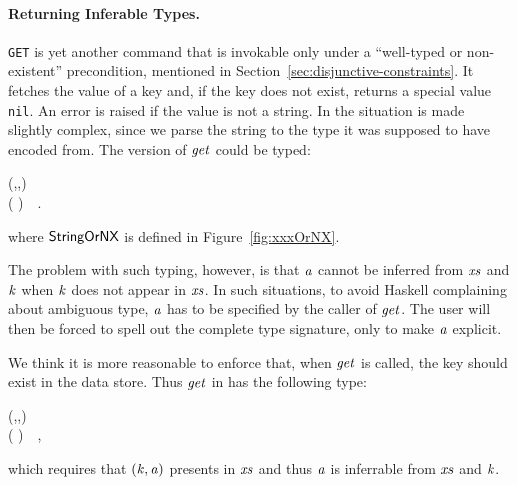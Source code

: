 \paragraph{Returning Inferable Types.} \texttt{GET} is yet another command that
is invokable only under a ``well-typed or non-existent'' precondition,
mentioned in Section~\ref{sec:disjunctive-constraints}. It fetches the value of
a key and, if the key does not exist, returns a special value \texttt{nil}. An
error is raised if the value is not a string. In \Edis{} the situation is made
slightly complex, since we parse the string to the type it was supposed to have
encoded from. The \Edis{} version of \ensuremath{\Varid{get}} could be typed:
\begin{hscode}\SaveRestoreHook
{}%
%
%
\>[B]{}\<[6]%
\>[6]{}\mathbin{::}(\;,\;,\;\;){}\<[E]%
\\
\>[6]{}\Rightarrow {}\;\to {}\;\;\;( \uplus {}\;)~~.{}\<[E]%
\ColumnHook
\end{hscode}\resethooks
where \ensuremath{\Conid{StringOrNX}} is defined in Figure~\ref{fig:xxxOrNX}.

The problem with such typing, however, is that \ensuremath{\Varid{a}} cannot be inferred from \ensuremath{\Varid{xs}}
and \ensuremath{\Varid{k}} when \ensuremath{\Varid{k}} does not appear in \ensuremath{\Varid{xs}}. In such situations, to avoid Haskell
complaining about ambiguous type, \ensuremath{\Varid{a}} has to be specified by the caller of
\ensuremath{\Varid{get}}. The user will then be forced to spell out the complete type signature,
only to make \ensuremath{\Varid{a}} explicit.

We think it is more reasonable to enforce that, when \ensuremath{\Varid{get}} is called, the key
should exist in the data store. Thus \ensuremath{\Varid{get}} in \Redis{} has the following type:
\begin{hscode}\SaveRestoreHook
{}%
%
%
\>[B]{}\<[6]%
\>[6]{}\mathbin{::}(\;,\;,\;\;\mathrel{\sim}\;){}\<[E]%
\\
\>[6]{}\Rightarrow {}\;\to {}\;\;\;( \uplus {}\;)~~,{}\<[E]%
\ColumnHook
\end{hscode}\resethooks
which requires that \ensuremath{(\Varid{k},\Varid{a})} presents in \ensuremath{\Varid{xs}} and thus \ensuremath{\Varid{a}} is inferrable from
\ensuremath{\Varid{xs}} and \ensuremath{\Varid{k}}.

